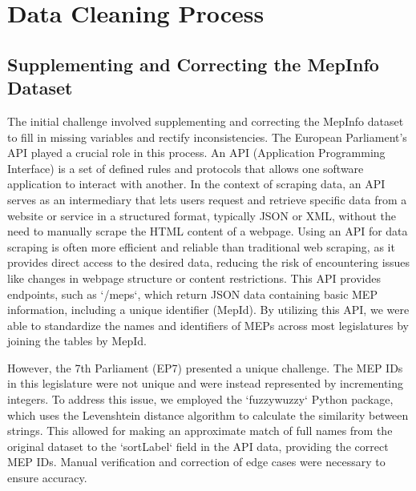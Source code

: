 \documentclass{report}
\begin{document}
    \chapter{Data Cleaning Process}


        \section{Supplementing and Correcting the MepInfo Dataset}


            The initial challenge involved supplementing and correcting the MepInfo dataset to fill in missing variables
            and
            rectify inconsistencies. The European Parliament's API played a crucial role in this process. An API
            (Application
            Programming Interface) is a set of defined rules and protocols that allows one software application to
            interact with
            another. In the context of scraping data, an API serves as an intermediary that lets users request and
            retrieve
            specific data from a website or service in a structured format, typically JSON or XML, without the need to
            manually
            scrape the HTML content of a webpage.
            Using an API for data scraping is often more efficient and reliable than traditional web scraping, as it
            provides
            direct access to the desired data, reducing the risk of encountering issues like changes in webpage
            structure or
            content restrictions. This API provides endpoints, such as `/meps`, which return JSON data containing basic
            MEP
            information, including a unique identifier (MepId). By utilizing this API, we were able to standardize the
            names and
            identifiers of MEPs across most legislatures by joining the tables by MepId.

            However, the 7th Parliament (EP7) presented a unique challenge. The MEP IDs in this legislature were not
            unique and
            were instead represented by incrementing integers. To address this issue, we employed the `fuzzywuzzy`
            Python
            package, which uses the Levenshtein distance algorithm to calculate the similarity between strings. This
            allowed for
            making an approximate match of full names from the original dataset to the `sortLabel` field in the API
            data,
            providing the correct MEP IDs. Manual verification and correction of edge cases were necessary to ensure
            accuracy.
\end{document}
